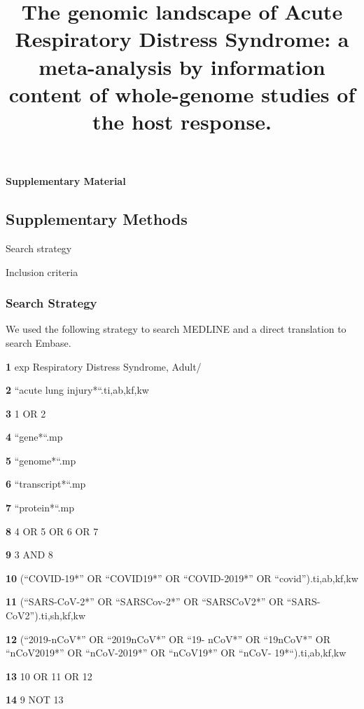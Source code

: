 \documentclass[
  11,
  a4paper,
]{article}
\title{The genomic landscape of Acute Respiratory Distress Syndrome: a
meta-analysis by information content of whole-genome studies of the host
response.}
\author{}
\date{}
\begin{document}
\maketitle

\begin{center}

\textbf{\LARGE Supplementary Material}

\end{center}

\newpage

\subsection{Supplementary Methods}\label{supplementary-methods}

Search strategy

Inclusion criteria

\newpage

\subsubsection{Search Strategy}\label{search-strategy}

We used the following strategy to search MEDLINE and a direct
translation to search Embase.

\textbf{1} exp Respiratory Distress Syndrome, Adult/

\textbf{2} ``acute lung injury*``.ti,ab,kf,kw

\textbf{3} 1 OR 2

\textbf{4} ``gene*``.mp

\textbf{5} ``genome*``.mp

\textbf{6} ``transcript*``.mp

\textbf{7} ``protein*``.mp

\textbf{8} 4 OR 5 OR 6 OR 7

\textbf{9} 3 AND 8

\textbf{10} (``COVID-19*'' OR ``COVID19*'' OR ``COVID-2019*'' OR
``covid'').ti,ab,kf,kw

\textbf{11} (``SARS-CoV-2*'' OR ``SARSCov-2*'' OR ``SARSCoV2*'' OR
``SARS-CoV2'').ti,sh,kf,kw

\textbf{12} (``2019-nCoV*'' OR ``2019nCoV*'' OR ``19- nCoV*'' OR
``19nCoV*'' OR ``nCoV2019*'' OR ``nCoV-2019*'' OR ``nCoV19*'' OR ``nCoV-
19*``).ti,ab,kf,kw

\textbf{13} 10 OR 11 OR 12

\textbf{14} 9 NOT 13
\end{document}
